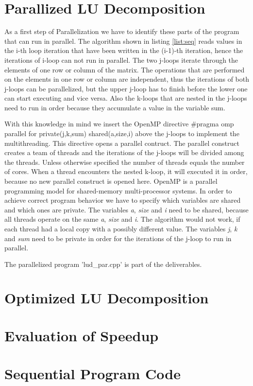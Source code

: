 \documentclass[a4paper,oneside,12pt,titlepage,parskip=true]{scrartcl}   %
\begin{document}
\section{Parallized LU Decomposition}
As a first step of Parallelization we have to identify these parts of the program that can run in parallel. 
The algorithm shown in listing \ref{list:seq} reads values in the i-th loop iteration that have been written in the (i-1)-th iteration, 
hence the iterations of i-loop can not run in parallel. 
The two j-loops iterate through the elements of one row or column of the matrix.
The operations that are performed on the elements in one row or column are independent, 
thus the iterations of both j-loops can be parallelized, 
but the upper j-loop has to finish before the lower one can start executing and vice versa.
Also the k-loops that are nested in the j-loops need to run in order because they accumulate a value in the variable sum.

With this knowledge in mind we insert the OpenMP directive \#pragma omp parallel for private(j,k,sum) shared(a,size,i) above the j-loops to implement the multithreading.
This directive opens a parallel contruct. 
The parallel construct creates a team of threads and the iterations of the j-loops will be divided among the threads. 
Unless otherwise specified the number of threads equals the number of cores.
When a thread encounters the nested k-loop, it will executed it in order, because no new parallel construct is opened here.
OpenMP is a parallel programming model for shared-memory multi-processor systems. 
In order to achieve correct program behavior we have to specify which variables are shared and which ones are private.
The variables \textit{a}, \textit{size} and \textit{i} need to be shared, because all threads operate on the same \textit{a}, \textit{size} and \textit{i}. 
The algorithm would not work, if each thread had a local copy with a possibly different value.
The variables \textit{j}, \textit{k} and \textit{sum} need to be private in order for the iterations of the j-loop to run in parallel.

The parallelized program 'lud\_par.cpp' is part of the deliverables.

\section{Optimized LU Decomposition}
\section{Evaluation of Speedup}

\newpage
\appendix
\section{Sequential Program Code}

\end{document}
